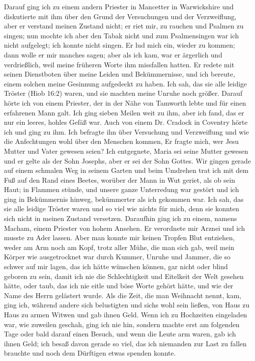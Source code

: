 Darauf ging ich zu einem andern Priester in Mancetter in
Warwickshire und diskutierte mit ihm 
über den Grund der Versuchungen 
und der Verzweiflung, aber er verstand meinen Zustand
nicht; er riet mir, zu rauchen und Psalmen zu singen; nun mochte
ich aber den Tabak nicht 
und zum Psalmensingen war ich nicht
aufgelegt; ich konnte nicht singen. Er lud mich ein, wieder zu
kommen; dann wolle er mir manches sagen; aber als ich kam,
war er ärgerlich und verdrießlich, weil meine früheren Worte ihm
missfallen hatten. Er redete mit seinen Dienstboten über meine
Leiden und Bekümmernisse, und ich bereute, einem solchen meine
Gesinnung aufgedeckt zu haben. Ich sah, das sie alle leidige
Tröster (Hiob 16:2) waren, 
und sie machten meine Unruhe noch
größer. Darauf hörte ich von einem Priester, der in der Nähe
von Tamworth lebte und für einen erfahrenen Mann galt. Ich
ging sieben Meilen weit zu ihm, aber ich fand, das er nur ein
leeres, hohles Gefäß war. Auch von einem Dr. Cradock in Coventry
hörte ich und ging zu ihm. Ich befragte ihn über Versuchung
und Verzweiflung und wie die Anfechtungen wohl über den
Menschen kommen, Er fragte mich, wer Jesu Mutter und Vater
gewesen seien? Ich entgegnete, Maria sei seine Mutter gewesen
und er gelte als der Sohn Josephs, aber er sei der Sohn Gottes.
Wir gingen gerade auf einem schmalen Weg in seinem Garten
und beim Umdrehen trat ich mit dem Fuß auf den Rand eines
Beetes, worüber der Mann in Wut geriet, als ob sein Haut; in
Flammen stünde, und unsere ganze Unterredung war gestört und
ich ging in Bekümmernis hinweg, bekümmerter als ich gekommen
war. Ich sah, das sie alle leidige Tröster waren und so viel
wie nichts für mich, denn sie konnten sich nicht in meinen Zustand
versetzen. Daraufhin ging ich zu einem, namens Macham, einem
Priester von hohem Ansehen. Er verordnete mir Arznei und ich
musste zu Ader lassen. Aber man konnte mir keinen Tropfen Blut
entziehen, weder am Arm noch am Kopf, trotz aller Mühe, die
man sich gab, weil mein Körper wie ausgetrocknet war
durch Kummer, Unruhe und Jammer, die so schwer auf mir
lagen, das ich hätte wünschen können, gar nicht oder blind geboren 
zu sein, damit ich nie die Schlechtigkeit und Eitelkeit der
Welt gesehen hätte, oder taub, das ich nie eitle und böse Worte
gehört hätte, und wie der Name des Herrn gelästert wurde. Als
die Zeit, die man Weihnacht 
nennt, kam, ging ich, während andere
sich belustigten und sichs wohl sein ließen, von Haus zu Haus zu
armen Witwen und gab ihnen Geld. Wenn ich zu Hochzeiten eingeladen 
war, wie zuweilen geschah, ging ich nie hin, sondern machte
erst am folgenden Tage oder bald darauf einen Besuch, und wenn
die Leute arm waren, gab ich ihnen Geld; ich besaß davon gerade 
so viel, das ich niemanden zur Last zu fallen brauchte und
noch dem Dürftigen etwas spenden konnte.

